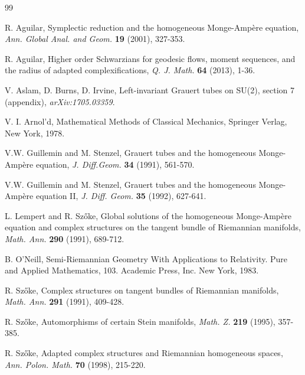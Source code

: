 \documentclass[12pt,reqno]{amsart}\usepackage{amssymb,amsmath,amscd,epsfig,amsthm,enumerate,import,eufrak}
\theoremstyle{definition}
\theoremstyle{remark}
\numberwithin{equation}{section}
\theoremstyle{plain}
\theoremstyle{definition}
\theoremstyle{remark}
\numberwithin{theorem}{section}
\begin{document}
\begin{thebibliography}{99}

 R. Aguilar, Symplectic reduction and the homogeneous Monge-Amp\`ere equation, \emph{Ann. Global Anal. and Geom.} {\bf 19} (2001), 327-353.

 R. Aguilar, Higher order Schwarzians for geodesic flows, moment sequences, and the radius of adapted complexifications, \emph{Q. J. Math.} {\bf 64} (2013), 1-36.

 V. Aslam, D. Burns, D. Irvine, Left-invariant Grauert tubes on SU(2), section 7 (appendix), \emph{arXiv:1705.03359}. 

 V. I. Arnol'd, Mathematical Methods of Classical Mechanics, Springer Verlag, New York, 1978.

 V.W. Guillemin and M. Stenzel, Grauert tubes and the homogeneous Monge-Amp\`ere equation, \emph{J. Diff.Geom.} {\bf 34} (1991), 561-570.

 V.W. Guillemin and M. Stenzel, Grauert tubes and the homogeneous Monge-Amp\`ere equation II, \emph{J. Diff. Geom.} {\bf 35} (1992), 627-641.

 L. Lempert and R. Sz\H{o}ke, Global solutions of the homogeneous Monge-Amp\`ere equation and complex structures on the tangent bundle of Riemannian manifolds, \emph{Math. Ann.} {\bf 290} (1991), 689-712.

 B. O'Neill, Semi-Riemannian Geometry With Applications to Relativity. Pure and Applied Mathematics, 103. Academic Press, Inc. New York, 1983.

 R. Sz\H{o}ke, Complex structures on tangent bundles of Riemannian manifolds, \emph{Math. Ann.} {\bf 291} (1991), 409-428.

 R. Sz\H{o}ke, Automorphisms of certain Stein manifolds, \emph{Math. Z.} {\bf 219} (1995), 357-385.

 R. Sz\H{o}ke, Adapted complex structures and Riemannian homogeneous spaces, \emph{Ann. Polon. Math.} {\bf 70} (1998), 215-220.


\end{thebibliography}
%
%
%
%
%
%
%
%
%
%
%
%
%
%
%
%
\end{document}
